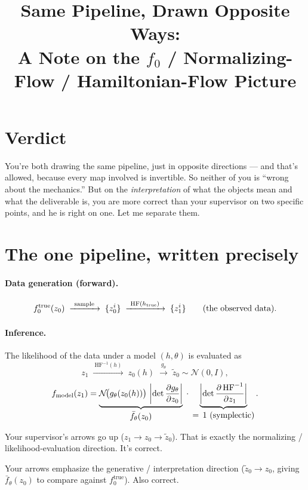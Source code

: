 \documentclass[11pt]{article}
\title{Same Pipeline, Drawn Opposite Ways:\\ A Note on the $f_0$ / Normalizing-Flow / Hamiltonian-Flow Picture}
\author{}
\date{}
\newcommand{\Ntrue}{f_0^{\text{true}}}
\newcommand{\HF}{\mathrm{HF}}
\begin{document}
\maketitle

\section*{Verdict}

You're both drawing the same pipeline, just in opposite directions --- and that's
allowed, because every map involved is invertible. So neither of you is ``wrong about
the mechanics.'' But on the \emph{interpretation} of what the objects mean and what the
deliverable is, you are more correct than your supervisor on two specific points, and he
is right on one. Let me separate them.

\section*{The one pipeline, written precisely}

\paragraph{Data generation (forward).}
\[
  \Ntrue(z_0)
  \;\xrightarrow{\ \text{sample}\ }\;
  \{z_0^i\}
  \;\xrightarrow{\ \HF(h_{\rm true})\ }\;
  \{z_1^i\}
  \qquad (\text{the observed data}).
\]

\paragraph{Inference.}
The likelihood of the data under a model $(h,\theta)$ is evaluated as
\[
  z_1
  \;\xrightarrow{\ \HF^{-1}(h)\ }\;
  z_0(h)
  \;\xrightarrow{\ g_\theta\ }\;
  \tilde z_0 \sim \mathcal N(0,I),
\]
\[
  f_{\rm model}(z_1)
  =
  \underbrace{%
    \mathcal N\!\big(g_\theta(z_0(h))\big)\,
    \left|\det\frac{\partial g_\theta}{\partial z_0}\right|
  }_{\displaystyle \bar f_\theta(z_0)}
  \;\cdot\;
  \underbrace{%
    \left|\det\frac{\partial\,\HF^{-1}}{\partial z_1}\right|
  }_{\displaystyle =\,1\ (\text{symplectic})}.
\]

Your supervisor's arrows go up ($z_1\to z_0\to\tilde z_0$). That is exactly the
normalizing / likelihood-evaluation direction. It's correct.

Your arrows emphasize the generative / interpretation direction
($\tilde z_0\to z_0$, giving $\bar f_\theta(z_0)$ to compare against $\Ntrue$).
Also correct.
\end{document}
